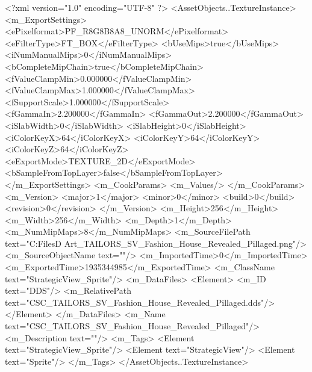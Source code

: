 <?xml version="1.0" encoding="UTF-8" ?>
<AssetObjects..TextureInstance>
	<m_ExportSettings>
		<ePixelformat>PF_R8G8B8A8_UNORM</ePixelformat>
		<eFilterType>FT_BOX</eFilterType>
		<bUseMips>true</bUseMips>
		<iNumManualMips>0</iNumManualMips>
		<bCompleteMipChain>true</bCompleteMipChain>
		<fValueClampMin>0.000000</fValueClampMin>
		<fValueClampMax>1.000000</fValueClampMax>
		<fSupportScale>1.000000</fSupportScale>
		<fGammaIn>2.200000</fGammaIn>
		<fGammaOut>2.200000</fGammaOut>
		<iSlabWidth>0</iSlabWidth>
		<iSlabHeight>0</iSlabHeight>
		<iColorKeyX>64</iColorKeyX>
		<iColorKeyY>64</iColorKeyY>
		<iColorKeyZ>64</iColorKeyZ>
		<eExportMode>TEXTURE_2D</eExportMode>
		<bSampleFromTopLayer>false</bSampleFromTopLayer>
	</m_ExportSettings>
	<m_CookParams>
		<m_Values/>
	</m_CookParams>
	<m_Version>
		<major>1</major>
		<minor>0</minor>
		<build>0</build>
		<revision>0</revision>
	</m_Version>
	<m_Height>256</m_Height>
	<m_Width>256</m_Width>
	<m_Depth>1</m_Depth>
	<m_NumMipMaps>8</m_NumMipMaps>
	<m_SourceFilePath text="C:\Users\Shadow\Desktop\Working Files\2D Art\Quarters\Tailors\StrategicView\CSC_TAILORS_SV_Fashion_House_Revealed_Pillaged.png"/>
	<m_SourceObjectName text=""/>
	<m_ImportedTime>0</m_ImportedTime>
	<m_ExportedTime>1935344985</m_ExportedTime>
	<m_ClassName text="StrategicView_Sprite"/>
	<m_DataFiles>
		<Element>
			<m_ID text="DDS"/>
			<m_RelativePath text="CSC_TAILORS_SV_Fashion_House_Revealed_Pillaged.dds"/>
		</Element>
	</m_DataFiles>
	<m_Name text="CSC_TAILORS_SV_Fashion_House_Revealed_Pillaged"/>
	<m_Description text=""/>
	<m_Tags>
		<Element text="StrategicView_Sprite"/>
		<Element text="StrategicView"/>
		<Element text="Sprite"/>
	</m_Tags>
</AssetObjects..TextureInstance>

